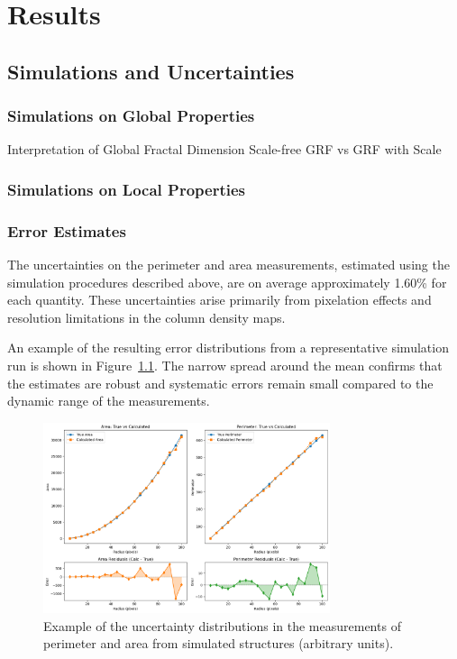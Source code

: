 \chapter{Results}
\label{ch:results}

\section{Simulations and Uncertainties}

\subsection{Simulations on Global Properties}
Interpretation of Global Fractal Dimension
Scale-free GRF vs GRF with Scale

\subsection{Simulations on Local Properties}

\subsection{Error Estimates}

The uncertainties on the perimeter and area measurements, estimated using the simulation procedures described above, are on average approximately 1.60\% for each quantity. These uncertainties arise primarily from pixelation effects and resolution limitations in the column density maps.  

An example of the resulting error distributions from a representative simulation run is shown in Figure~\ref{fig:uncertainties}. The narrow spread around the mean confirms that the estimates are robust and systematic errors remain small compared to the dynamic range of the measurements.

\begin{figure}[t]
    \centering
    \includegraphics[width=0.75\textwidth]{figures/perimeter_area_uncertainties.png}
    \caption{Example of the uncertainty distributions in the measurements of perimeter and area from simulated structures (arbitrary units).}
    \label{fig:uncertainties}
\end{figure}

